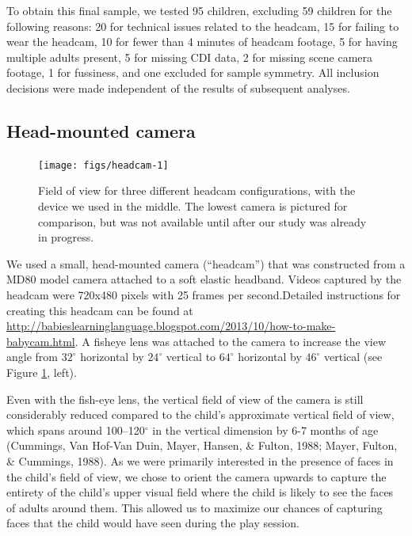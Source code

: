 \documentclass[10pt, letterpaper]{article}
\newenvironment{CodeChunk}{}{}
\begin{document}
To obtain this final sample, we tested 95 children, excluding 59
children for the following reasons: 20 for technical issues related to
the headcam, 15 for failing to wear the headcam, 10 for fewer than 4
minutes of headcam footage, 5 for having multiple adults present, 5 for
missing CDI data, 2 for missing scene camera footage, 1 for fussiness,
and one excluded for sample symmetry. All inclusion decisions were made
independent of the results of subsequent analyses.

\subsection{Head-mounted camera}\label{head-mounted-camera}

\begin{CodeChunk}
\begin{figure}[H]

{\centering \texttt{[image: figs/headcam-1]} 

}

\caption[Field of view for three different headcam configurations, with the device we used in the middle]{Field of view for three different headcam configurations, with the device we used in the middle. The lowest camera is pictured for comparison, but was not available until after our study was already in progress.}\label{fig:headcam}
\end{figure}
\end{CodeChunk}

We used a small, head-mounted camera (``headcam'') that was constructed
from a MD80 model camera attached to a soft elastic headband. Videos
captured by the headcam were 720x480 pixels with 25 frames per
second.Detailed instructions for creating this headcam can be found at
\url{http://babieslearninglanguage.blogspot.com/2013/10/how-to-make-babycam.html}.
A fisheye lens was attached to the camera to increase the view angle
from \(32^{\circ}\) horizontal by \(24^{\circ}\) vertical to
\(64^{\circ}\) horizontal by \(46^{\circ}\) vertical (see Figure
\ref{fig:headcam}, left).

Even with the fish-eye lens, the vertical field of view of the camera is
still considerably reduced compared to the child's approximate vertical
field of view, which spans around 100--120\(^{\circ}\) in the vertical
dimension by 6-7 months of age (Cummings, Van Hof-Van Duin, Mayer,
Hansen, \& Fulton, 1988; Mayer, Fulton, \& Cummings, 1988). As we were
primarily interested in the presence of faces in the child's field of
view, we chose to orient the camera upwards to capture the entirety of
the child's upper visual field where the child is likely to see the
faces of adults around them. This allowed us to maximize our chances of
capturing faces that the child would have seen during the play session.
\end{document}
